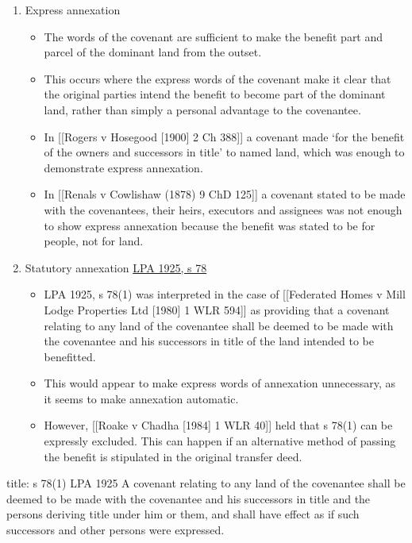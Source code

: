 \documentclass[
]{article}
\newenvironment{Shaded}{}{}
\newcommand{\NormalTok}[1]{#1}
\providecommand{\tightlist}{%
  \setlength{\itemsep}{0pt}\setlength{\parskip}{0pt}}
\begin{document}
\begin{enumerate}
\def\labelenumi{\arabic{enumi}.}
\item
  Express annexation

  \begin{itemize}
  \tightlist
  \item
    The words of the covenant are sufficient to make the benefit part
    and parcel of the dominant land from the outset.
  \item
    This occurs where the express words of the covenant make it clear
    that the original parties intend the benefit to become part of the
    dominant land, rather than simply a personal advantage to the
    covenantee.
  \item
    In {[}{[}Rogers v Hosegood {[}1900{]} 2 Ch 388{]}{]} a covenant made
    `for the benefit of the owners and successors in title' to named
    land, which was enough to demonstrate express annexation.
  \item
    In {[}{[}Renals v Cowlishaw (1878) 9 ChD 125{]}{]} a covenant stated
    to be made with the covenantees, their heirs, executors and
    assignees was not enough to show express annexation because the
    benefit was stated to be for people, not for land.
  \end{itemize}
\item
  Statutory annexation
  \href{https://www.legislation.gov.uk/ukpga/Geo5/15-16/20/section/78}{LPA
  1925, s 78}

  \begin{itemize}
  \tightlist
  \item
    LPA 1925, s 78(1) was interpreted in the case of {[}{[}Federated
    Homes v Mill Lodge Properties Ltd {[}1980{]} 1 WLR 594{]}{]} as
    providing that a covenant relating to any land of the covenantee
    shall be deemed to be made with the covenantee and his successors in
    title of the land intended to be benefitted.
  \item
    This would appear to make express words of annexation unnecessary,
    as it seems to make annexation automatic.
  \item
    However, {[}{[}Roake v Chadha {[}1984{]} 1 WLR 40{]}{]} held that s
    78(1) can be expressly excluded. This can happen if an alternative
    method of passing the benefit is stipulated in the original transfer
    deed.
  \end{itemize}
\end{enumerate}

\begin{Shaded}
\begin{Highlighting}[]
\NormalTok{title: s 78(1) LPA 1925}
\NormalTok{A covenant relating to any land of the covenantee shall be deemed to be made with the covenantee and his successors in title and the persons deriving title under him or them, and shall have effect as if such successors and other persons were expressed.}
\end{Highlighting}
\end{Shaded}
\end{document}
